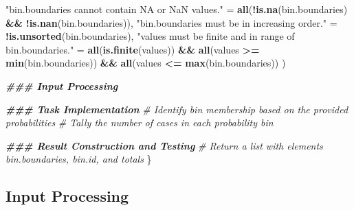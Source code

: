 \documentclass[
]{book}
\newenvironment{Shaded}{\begin{snugshade}}{\end{snugshade}}
\newcommand{\CommentTok}[1]{\textcolor[rgb]{0.56,0.35,0.01}{\textit{#1}}}
\newcommand{\DocumentationTok}[1]{\textcolor[rgb]{0.56,0.35,0.01}{\textbf{\textit{#1}}}}
\newcommand{\FunctionTok}[1]{\textcolor[rgb]{0.13,0.29,0.53}{\textbf{#1}}}
\newcommand{\NormalTok}[1]{#1}
\newcommand{\OtherTok}[1]{\textcolor[rgb]{0.56,0.35,0.01}{#1}}
\newcommand{\SpecialCharTok}[1]{\textcolor[rgb]{0.81,0.36,0.00}{\textbf{#1}}}
\newcommand{\StringTok}[1]{\textcolor[rgb]{0.31,0.60,0.02}{#1}}
\begin{document}
\begin{Shaded}
\begin{Highlighting}[]
    \StringTok{"\textasciigrave{}bin.boundaries\textasciigrave{} cannot contain NA or NaN values."} \OtherTok{=} 
      \FunctionTok{all}\NormalTok{(}\SpecialCharTok{!}\FunctionTok{is.na}\NormalTok{(bin.boundaries) }\SpecialCharTok{\&\&} \SpecialCharTok{!}\FunctionTok{is.nan}\NormalTok{(bin.boundaries)),}
    \StringTok{"\textasciigrave{}bin.boundaries\textasciigrave{} must be in increasing order."} \OtherTok{=} \SpecialCharTok{!}\FunctionTok{is.unsorted}\NormalTok{(bin.boundaries),}
    \StringTok{"\textasciigrave{}values\textasciigrave{} must be finite and in range of \textasciigrave{}bin.boundaries\textasciigrave{}."} \OtherTok{=} 
      \FunctionTok{all}\NormalTok{(}\FunctionTok{is.finite}\NormalTok{(values)) }\SpecialCharTok{\&\&} \FunctionTok{all}\NormalTok{(values }\SpecialCharTok{\textgreater{}=} \FunctionTok{min}\NormalTok{(bin.boundaries)) }\SpecialCharTok{\&\&} 
      \FunctionTok{all}\NormalTok{(values }\SpecialCharTok{\textless{}=} \FunctionTok{max}\NormalTok{(bin.boundaries))}
\NormalTok{  )}
  
  \DocumentationTok{\#\#\# Input Processing}
  
  \DocumentationTok{\#\#\# Task Implementation}
  \CommentTok{\# Identify bin membership based on the provided probabilities}
  \CommentTok{\# Tally the number of cases in each probability bin}
  
  \DocumentationTok{\#\#\# Result Construction and Testing}
  \CommentTok{\# Return a list with elements \textasciigrave{}bin.boundaries\textasciigrave{}, \textasciigrave{}bin.id\textasciigrave{}, and \textasciigrave{}totals\textasciigrave{}}
\NormalTok{\}}
\end{Highlighting}
\end{Shaded}

\hypertarget{input-processing-1}{%
\subsection{Input Processing}\label{input-processing-1}}
\end{document}

